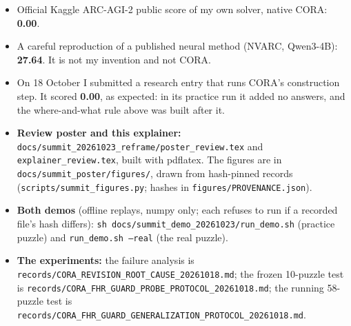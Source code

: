\documentclass[11pt]{article}
\newcommand{\bigpart}[1]{\par\needspace{10\baselineskip}\vspace{1.2em}{\Large\bfseries #1}\par\vspace{0.1em}}
\begin{document}
\bigpart{Part 6. Benchmark context}
\begin{itemize}
  \item Official Kaggle ARC-AGI-2 public score of my own solver, native CORA: \textbf{0.00}.
  \item A careful reproduction of a published neural method (NVARC, Qwen3-4B): \textbf{27.64}. It is not my
    invention and not CORA.
  \item On 18 October I submitted a research entry that runs CORA's construction step. It scored
    \textbf{0.00}, as expected: in its practice run it added no answers, and the where-and-what rule above was built after it.
\end{itemize}

\bigpart{Part 7. How to reproduce what you see}
{\raggedright
\begin{itemize}
  \item \textbf{Review poster and this explainer:}
    \texttt{docs/summit\_20261023\_reframe/poster\_review.tex} and \texttt{explainer\_review.tex}, built with
    pdflatex. The figures are in \texttt{docs/summit\_poster/figures/}, drawn from hash-pinned records
    (\texttt{scripts/summit\_figures.py}; hashes in \texttt{figures/PROVENANCE.json}).
  \item \textbf{Both demos} (offline replays, numpy only; each refuses to run if a recorded file's hash
    differs): \texttt{sh docs/summit\_demo\_20261023/run\_demo.sh} (practice puzzle) and
    \texttt{run\_demo.sh --real} (the real puzzle).
  \item \textbf{The experiments:} the failure analysis is \texttt{records/CORA\_REVISION\_ROOT\_CAUSE\_20261018.md};
    the frozen 10-puzzle test is \texttt{records/CORA\_FHR\_GUARD\_PROBE\_PROTOCOL\_20261018.md}; the
    running 58-puzzle test is \texttt{records/CORA\_FHR\_GUARD\_GENERALIZATION\_PROTOCOL\_20261018.md}.
\end{itemize}\par}
\end{document}
